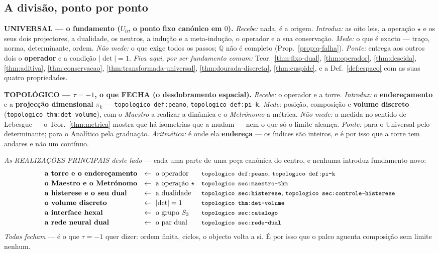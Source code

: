 \documentclass[11pt,a4paper]{article}
\newcommand{\code}[1]{\texttt{\small #1}}
\newcommand{\abs}[1]{\lvert #1\rvert}
\begin{document}
\subsection*{A divisão, ponto por ponto}

\noindent\textbf{UNIVERSAL --- o fundamento ($U_0$, o ponto fixo canónico em $0$).}
\emph{Recebe:} nada, é a origem. \emph{Introduz:} as oito leis, a operação $\star$ e os
seus dois projectores, a dualidade, os neutros, a indução e a meta-indução, o operador e a
sua conservação. \emph{Mede:} o que é exacto --- traço, norma, determinante, ordem.
\emph{Não mede:} o que exige todos os passos; $\mathbb{Q}$ não é completo
(Prop.~\ref{prop:q-falha}). \emph{Ponte:} entrega aos outros dois o \textbf{operador} e a
condição $\abs{\det}=1$. \emph{Fica aqui, por ser fundamento comum:}
Teor.~\ref{thm:fixo-dual}, \ref{thm:operador}, \ref{thm:descida}, \ref{thm:aditiva},
\ref{thm:conservacao}, \ref{thm:transformada-universal}, \ref{thm:dourada-discreta},
\ref{thm:cuspide}, e a Def.~\ref{def:espaco} com as suas quatro propriedades.

\noindent\textbf{TOPOLÓGICO --- $\tau=-1$, o que FECHA (o desdobramento espacial).}
\emph{Recebe:} o operador e a torre. \emph{Introduz:} o \textbf{endereçamento} e a
\textbf{projecção dimensional} $\pi_k$ --- \code{topologico def:peano}, \code{topologico def:pi-k}. \emph{Mede:}
posição, composição e \textbf{volume discreto} (\code{topologico thm:det-volume}), com o \emph{Maestro}
a realizar a dinâmica e o \emph{Metrónomo} a métrica. \emph{Não mede:} a medida no sentido
de Lebesgue --- o Teor.~\ref{thm:metrica} mostra que há isometrias que a mudam --- nem o
que só o limite alcança. \emph{Ponte:} para o Universal pelo determinante; para o Analítico
pela graduação. \emph{Aritmética:} é onde ela \textbf{endereça} --- os índices são
inteiros, e é por isso que a torre tem andares e não um contínuo.

\smallskip
\noindent\emph{As REALIZAÇÕES PRINCIPAIS deste lado} --- cada uma parte de uma peça
canónica do centro, e nenhuma introduz fundamento novo:
\[
\begin{array}{lll}
\textbf{a torre e o endereçamento} & \leftarrow\ \text{o operador} &
\text{\code{topologico def:peano}, \code{topologico def:pi-k}}\\[2pt]
\textbf{o Maestro e o Metrónomo} & \leftarrow\ \text{a operação }\star &
\text{\code{topologico sec:maestro-thm}}\\[2pt]
\textbf{a histerese e o seu dual} & \leftarrow\ \text{a dualidade} &
\text{\code{topologico sec:histerese}, \code{topologico sec:controle-histerese}}\\[2pt]
\textbf{o volume discreto} & \leftarrow\ \abs{\det}=1 &
\text{\code{topologico thm:det-volume}}\\[2pt]
\textbf{a interface hexal} & \leftarrow\ \text{o grupo }S_3 &
\text{\code{topologico sec:catalogo}}\\[2pt]
\textbf{a rede neural dual} & \leftarrow\ \text{o par dual} &
\text{\code{topologico sec:rede-dual}}
\end{array}
\]
\emph{Todas fecham} --- é o que $\tau=-1$ quer dizer: ordem finita, ciclos, o objecto volta
a si. É por isso que o palco aguenta composição sem limite nenhum.
\end{document}
